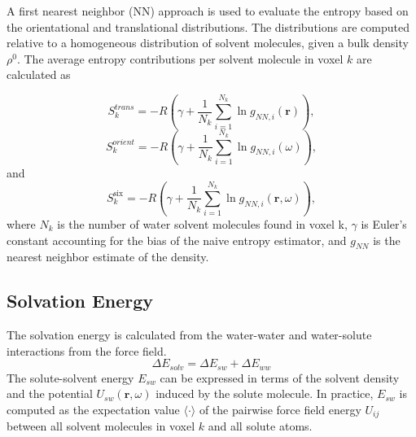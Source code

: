 \documentclass[9pt,tutorial,pubversion]{livecoms}
\begin{document}
A first nearest neighbor (NN) approach is used to evaluate the entropy based on the orientational and translational distributions.
The distributions are computed relative to a homogeneous distribution of solvent molecules, given a bulk density $\rho^0$.
The average entropy contributions per solvent molecule in voxel $k$ are calculated as

\begin{equation}
	S_{k}^\textit{trans} = -R \left( \gamma + \frac{1}{N_\textit{k}} \sum _{i=1}^{N_k} \ln g_{NN, \textit{i}}(\textbf{r}) \right),
\end{equation}
\begin{equation}
S_{k}^\textit{orient} = -R \left( \gamma + \frac{1}{N_k} \sum _{i=1}^{N_k} \ln g_{NN, i}(\omega) \right)
,
\end{equation}
and
\begin{equation}
S_\textit{k}^\text{six} = -R \left( \gamma + \frac{1}{N_\textit{k}} \sum _{i=1}^{N_k} \ln g_{NN, \textit{i}}(\textbf{r},\omega) \right),
\end{equation}
where $N_\textit{k}$ is the number of water solvent molecules found in voxel k, $\gamma$ is Euler's constant accounting for the bias of the naive entropy estimator, and $g_\textit{NN}$ is the nearest neighbor estimate of the density.

\subsection{Solvation Energy}
The solvation energy is calculated from the water-water and water-solute interactions from the force field.
\begin{equation}
	\Delta E_\textit{solv} = \Delta E_\textit{sw} + \Delta E_\textit{ww}
\end{equation}
The solute-solvent energy $E_{sw}$ can be expressed in terms of the solvent density and the potential $U_{sw}(\textbf{r},\omega)$ induced by the solute molecule.
In practice, $E_{sw}$ is computed as the expectation value $\langle\cdot\rangle$ of the pairwise force field energy $U_{ij}$ between all solvent molecules in voxel $k$ and all solute atoms.
\end{document}

